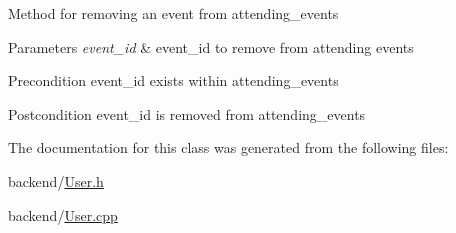 Method for removing an event from attending\+\_\+events 
\begin{DoxyParams}{Parameters}
{\em event\+\_\+id} & event\+\_\+id to remove from attending events \\
\hline
\end{DoxyParams}
\begin{DoxyPrecond}{Precondition}
event\+\_\+id exists within attending\+\_\+events 
\end{DoxyPrecond}
\begin{DoxyPostcond}{Postcondition}
event\+\_\+id is removed from attending\+\_\+events 
\end{DoxyPostcond}


The documentation for this class was generated from the following files\+:\begin{DoxyCompactItemize}
\item 
backend/\mbox{\hyperlink{_user_8h}{User.\+h}}\item 
backend/\mbox{\hyperlink{_user_8cpp}{User.\+cpp}}\end{DoxyCompactItemize}
